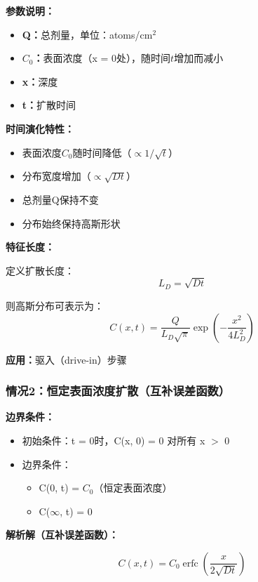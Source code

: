 \documentclass[UTF8,12pt,a4paper]{ctexart}
\begin{document}
\textbf{参数说明：}
\begin{itemize}
    \item \textbf{Q：}总剂量，单位：atoms/cm$^2$
    \item \textbf{$C_0$：}表面浓度（x = 0处），随时间$t$增加而减小
    \item \textbf{x：}深度
    \item \textbf{t：}扩散时间
\end{itemize}

\textbf{时间演化特性：}
\begin{itemize}
    \item 表面浓度$C_0$随时间降低（$\propto 1/\sqrt{t}$）
    \item 分布宽度增加（$\propto \sqrt{Dt}$）
    \item 总剂量Q保持不变
    \item 分布始终保持高斯形状
\end{itemize}

\textbf{特征长度：}

定义扩散长度：
\begin{equation}
L_D = \sqrt{Dt}
\end{equation}

则高斯分布可表示为：
\begin{equation}
C(x,t) = \frac{Q}{L_D\sqrt{\pi}} \exp\left(-\frac{x^2}{4L_D^2}\right)
\end{equation}

\textbf{应用：}驱入（drive-in）步骤

\subsubsection{情况2：恒定表面浓度扩散（互补误差函数）}

\textbf{边界条件：}
\begin{itemize}
    \item 初始条件：t = 0时，C(x, 0) = 0 对所有 x $>$ 0
    \item 边界条件：
    \begin{itemize}
        \item C(0, t) = $C_0$（恒定表面浓度）
        \item C($\infty$, t) = 0
    \end{itemize}
\end{itemize}

\textbf{解析解（互补误差函数）：}

\begin{equation}
C(x,t) = C_0 \operatorname{erfc}\left(\frac{x}{2\sqrt{Dt}}\right)
\end{equation}
\end{document}

